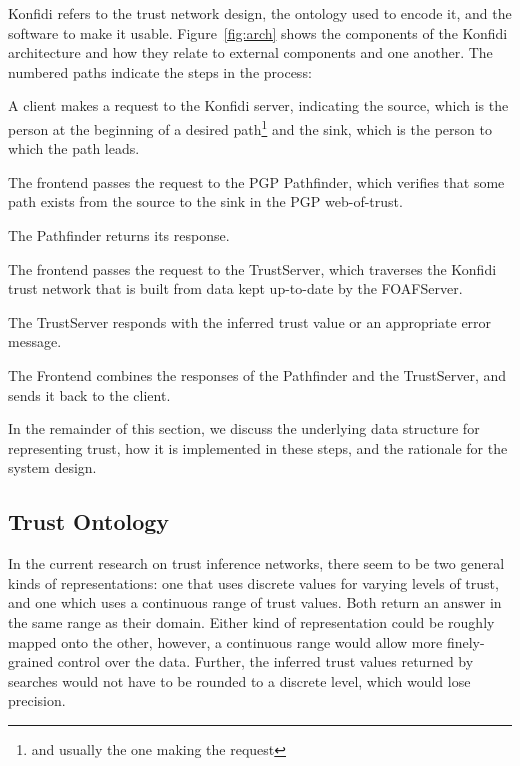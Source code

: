 \documentclass[letterpaper]{www2006-submission}
\newenvironment{enumerate_tight}{
\begin{enumerate}
  \setlength{\itemsep}{1pt}
  \setlength{\parskip}{0pt}
  \setlength{\parsep}{0pt}}{\end{enumerate}
}
\begin{document}
Konfidi refers to the trust network design, the ontology used to encode it, and the software to make it usable.  Figure~\ref{fig:arch} shows the components of the Konfidi architecture and how they relate to external components and one another.  The numbered paths indicate the steps in the process:  

\begin{enumerate_tight}
\item  A client makes a request to the Konfidi server, indicating the source, which is the person at the beginning of a desired path\footnote{and usually the one making the request} and the sink, which is the person to which the path leads.
\item  The frontend passes the request to the PGP Pathfinder, which verifies that some path exists from the source to the sink in the PGP web-of-trust.
\item  The Pathfinder returns its response.
\item  The frontend passes the request to the TrustServer, which traverses the Konfidi trust network that is built from data kept up-to-date by the FOAFServer.
\item  The TrustServer responds with the inferred trust value or an appropriate error message.
\item  The Frontend combines the responses of the Pathfinder and the TrustServer, and sends it back to the client.
\end{enumerate_tight}

In the remainder of this section, we discuss the underlying data structure for representing trust, how it is implemented in these steps, and the rationale for the system design.

\subsection{Trust Ontology}
In the current research on trust inference networks, there seem to be two general kinds of representations:  one that uses discrete values for varying levels of trust, and one which uses a continuous range of trust values.  Both return an answer in the same range as their domain.  Either kind of representation could be roughly mapped onto the other, however, a continuous range would allow more finely-grained control over the data.  Further, the inferred trust values returned by searches would not have to be rounded to a discrete level, which would lose precision.
\end{document}
